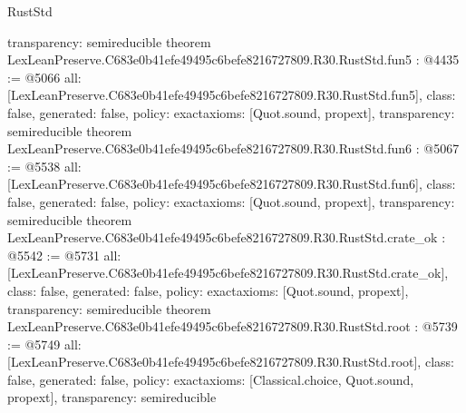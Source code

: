 \begin{lexlean}{RustStd}
\begin{coremodule}
{  transparency: semireducible
}
theorem LexLeanPreserve.C683e0b41efe49495c6befe8216727809.R30.RustStd.fun5 : @4435 := @5066 {
  all: [LexLeanPreserve.C683e0b41efe49495c6befe8216727809.R30.RustStd.fun5],
  class: false,
  generated: false,
  policy: exact{axioms: [Quot.sound, propext]},
  transparency: semireducible
}
theorem LexLeanPreserve.C683e0b41efe49495c6befe8216727809.R30.RustStd.fun6 : @5067 := @5538 {
  all: [LexLeanPreserve.C683e0b41efe49495c6befe8216727809.R30.RustStd.fun6],
  class: false,
  generated: false,
  policy: exact{axioms: [Quot.sound, propext]},
  transparency: semireducible
}
theorem LexLeanPreserve.C683e0b41efe49495c6befe8216727809.R30.RustStd.crate_ok : @5542 := @5731 {
  all: [LexLeanPreserve.C683e0b41efe49495c6befe8216727809.R30.RustStd.crate_ok],
  class: false,
  generated: false,
  policy: exact{axioms: [Quot.sound, propext]},
  transparency: semireducible
}
theorem LexLeanPreserve.C683e0b41efe49495c6befe8216727809.R30.RustStd.root : @5739 := @5749 {
  all: [LexLeanPreserve.C683e0b41efe49495c6befe8216727809.R30.RustStd.root],
  class: false,
  generated: false,
  policy: exact{axioms: [Classical.choice, Quot.sound, propext]},
  transparency: semireducible
}


\end{coremodule}
\end{lexlean}
